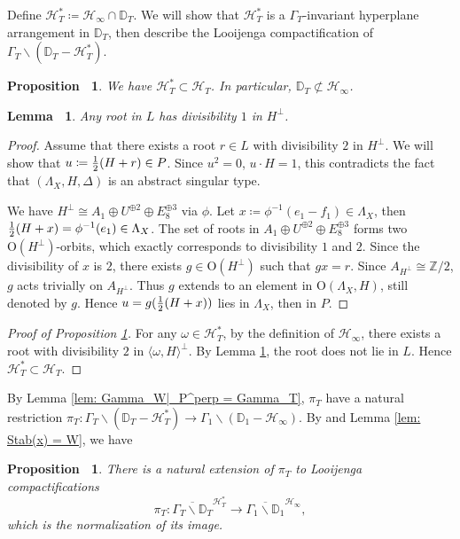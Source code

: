 \documentclass[12pt,reqno,a4paper]{amsart}
\newtheorem{lem}[thm]{Lemma~}
\newtheorem{prop}[thm]{Proposition~}
\theoremstyle{remark}
\theoremstyle{definition}
\begin{document}
Define $\mathcal{H}_T^*\coloneqq\mathcal{H}_\infty\cap\mathbb{D}_T$.
We will show that $\mathcal{H}_T^*$ is a $\Gamma_T$-invariant hyperplane arrangement in $\mathbb{D}_T$, then describe the Looijenga compactification of $\Gamma_T\backslash(\mathbb{D}_T-\mathcal{H}_T^*)$.
\begin{prop}
\label{prop: calH_* subset calH_T}
    We have $\mathcal{H}_T^*\subset\mathcal{H}_T$.
    In particular, $\mathbb{D}_T\not\subset\mathcal{H}_\infty$.
\end{prop}
\begin{lem}
\label{lem: div(root in L)=1}
    Any root in $L$ has divisibility $1$ in $H^\perp$.
\end{lem}
\begin{proof}
    Assume that there exists a root $r\in L$ with divisibility $2$ in $H^\perp$.
    We will show that $u\coloneqq {1\over2}(H+r)\in P$.
    Since $u^2=0$, $u\cdot H=1$, this contradicts the fact that $(\Lambda_X,H,\Delta)$ is an abstract singular type.

    We have $H^\perp\cong A_1\oplus U^{\oplus 2}\oplus E_8^{\oplus 3}$ via $\phi$.
    Let $x\coloneqq\phi^{-1}(e_1-f_1)\in\Lambda_X$, then ${1\over2}(H+x)=\phi^{-1}(e_1)\in\Lambda_X$.
    The set of roots in $A_1\oplus U^{\oplus 2}\oplus E_8^{\oplus 3}$ forms two $\mathrm{O}(H^\perp)$-orbits, which exactly corresponds to divisibility $1$ and $2$.
    Since the divisibility of $x$ is $2$, there exists $g\in\mathrm{O}(H^\perp)$ such that $g x=r$.
    Since $A_{H^\perp}\cong \mathbb{Z}/2$, $g$ acts trivially on $A_{H^\perp}$.
    Thus $g$ extends to an element in $\mathrm{O}(\Lambda_X,H)$, still denoted by $g$.
    Hence $u=g({1\over2}(H+x))$ lies in $\Lambda_X$, then in $P$.
\end{proof}
\begin{proof}[Proof of Proposition \ref{prop: calH_* subset calH_T}]
    For any $\omega\in\mathcal{H}_T^*$, by the definition of $\mathcal{H}_\infty$, there exists a root with divisibility $2$ in $\langle \omega,H \rangle^\perp$.
    By Lemma \ref{lem: div(root in L)=1}, the root does not lie in $L$.
    Hence $\mathcal{H}_T^*\subset\mathcal{H}_T$.
\end{proof}

By Lemma \ref{lem: Gamma_W|_P^perp = Gamma_T}, $\pi_T$ have a natural restriction $\pi_T\colon\Gamma_T\backslash(\mathbb{D}_T-\mathcal{H}_T^*)\to\Gamma_1\backslash(\mathbb{D}_1-\mathcal{H}_\infty)$.
By \cite[Theorem A.13]{yu2020fourfolds} and Lemma \ref{lem: Stab(x) = W}, we have 
\begin{prop}
\label{prop: Loo comp: type T to total}
    There is a natural extension of $\pi_T$ to Looijenga compactifications
    \begin{equation*}
        \pi_T\colon \overline{\Gamma_T\backslash\mathbb{D}_T}^{\mathcal{H}_T^*}\to \overline{\Gamma_1\backslash\mathbb{D}_1}^{\mathcal{H}_\infty},
    \end{equation*}
    which is the normalization of its image.
\end{prop}
\end{document}
